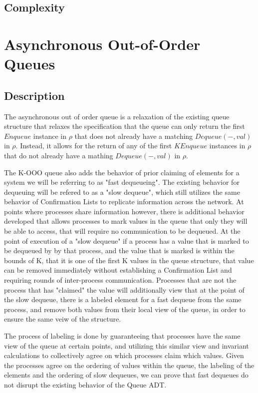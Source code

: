 \documentclass[a4paper,anonymous,USenglish]{lipics-v2021} %
\theoremstyle{definition}
\begin{document}
\subsection{Complexity}

\section{Asynchronous Out-of-Order Queues}

\subsection{Description}

The asynchronous out of order queue is a relaxation of the existing queue structure that relaxes the specification that the queue can only return the first $Enqueue$ instance in $\rho$ that does not already have a matching $Dequeue(-, val)$ in $\rho$. Instead, it allows for the return of any of the first $K Enqueue$ instances in $\rho$ that do not already have a mathing $Dequeue(-, val)$ in $\rho$. 

The K-OOO queue also adds the behavior of prior claiming of elements for a system we will be referring to as "fast dequeueing". The existing behavior for dequeuing will be refered to as a "slow dequeue", which still utilizes the same behavior of Confirmation Lists to replicate information across the network. At points where processes share information however, there is additional behavior developed that allows processes to mark values in the queue that only they will be able to access, that will require no communication to be dequeued. At the point of execution of a "slow dequeue" if a process has a value that is marked to be dequeued by by that process, and the value that is marked is within the bounds of K, that it is one of the first K values in the queue structure, that value can be removed immediately without establishing a Confirmation List and requiring rounds of inter-process communication. Processes that are not the process that has "claimed" the value will additionally view that at the point of the slow dequeue, there is a labeled element for a fast dequeue from the same process, and remove both values from their local view of the queue, in order to ensure the same veiw of the structure. 

The process of labeling is done by guaranteeing that processes have the same view of the queue at certain points, and utilizing this similar view and invariant calculations to collectively agree on which processes claim which values. Given the processes agree on the ordering of values within the queue, the labeling of the elements and the ordering of slow dequeues, we can prove that fast dequeues do not disrupt the existing behavior of the Queue ADT. 
\end{document}
